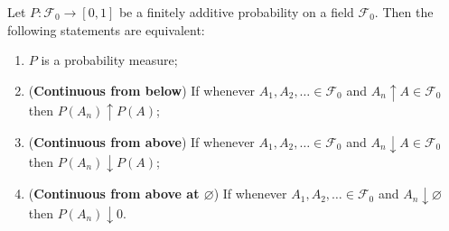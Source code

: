 \begin{theorem}
\label{thm: cae}
Let $P:\mathcal F_0\rightarrow [0,1]$ be a finitely additive probability on a field $\mathcal F_0$. Then the following statements are equivalent:
\begin{enumerate}
\item $P$ is a probability measure;
\item ({\bf Continuous from below}) If whenever $A_1, A_2, \ldots \in \mathcal F_0$ and $A_n\uparrow A\in\mathcal F_0$ then $P(A_n)\uparrow P(A)$;
\item ({\bf Continuous from above})  If whenever $A_1, A_2, \ldots \in \mathcal F_0$ and $A_n\downarrow A\in\mathcal F_0$ then $P(A_n)\downarrow P(A)$;
\item ({\bf Continuous from above at $\varnothing$}) If whenever $A_1, A_2, \ldots \in \mathcal F_0$ and $A_n\downarrow  \varnothing$ then $P(A_n)\downarrow 0$.
\end{enumerate}
\end{theorem}
